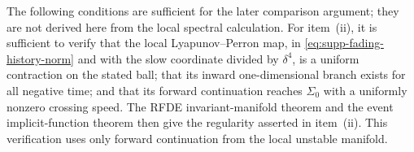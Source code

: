 \begin{remark}
The following conditions are sufficient for the later comparison argument;
they are not derived here from the local spectral calculation.  For
item~\textup{(ii)}, it is sufficient to verify that the local
Lyapunov--Perron map, in \cref{eq:supp-fading-history-norm} and with the slow
coordinate divided by \(\delta^4\), is a uniform contraction on the stated
ball; that its inward one-dimensional branch exists for all negative time;
and that its forward continuation reaches \(\Sigma_0\) with a uniformly
nonzero crossing speed.  The RFDE invariant-manifold theorem and the event
implicit-function theorem then give the regularity asserted in
item~\textup{(ii)}.  This verification uses only forward continuation from
the local unstable manifold.


\end{remark}
